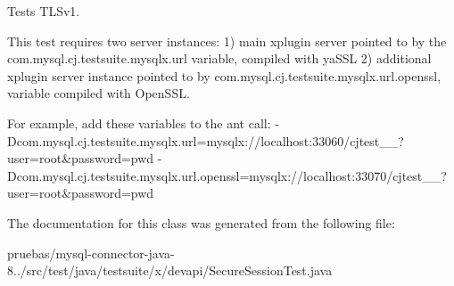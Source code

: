 Tests T\+L\+Sv1.

This test requires two server instances\+: 1) main xplugin server pointed to by the com.\+mysql.\+cj.\+testsuite.\+mysqlx.\+url variable, compiled with ya\+S\+SL 2) additional xplugin server instance pointed to by com.\+mysql.\+cj.\+testsuite.\+mysqlx.\+url.\+openssl, variable compiled with Open\+S\+SL.

For example, add these variables to the ant call\+: -\/\+Dcom.\+mysql.\+cj.\+testsuite.\+mysqlx.\+url=mysqlx\+://localhost\+:33060/cjtest\+\_\+\_?user=root\&password=pwd -\/\+Dcom.\+mysql.\+cj.\+testsuite.\+mysqlx.\+url.\+openssl=mysqlx\+://localhost\+:33070/cjtest\+\_\+\_?user=root\&password=pwd 

The documentation for this class was generated from the following file\+:\begin{DoxyCompactItemize}
\item 
pruebas/mysql-\/connector-\/java-\/8../src/test/java/testsuite/x/devapi/Secure\+Session\+Test.\+java\end{DoxyCompactItemize}
